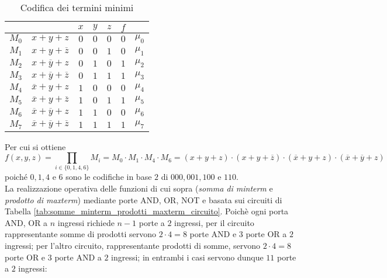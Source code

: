 \documentclass[a4paper]{extarticle}
\begin{document}
\begin{table}[H]
  \centering
  \begin{tabular}{c|c||ccc||c|c}
    $ $ & $ $ & $x$ & $y$ & $z$ & $f$\\
    \hline
    $M_0$ & $x + y + z$ & $0$ & $0$ & $0$ & $0$ & $\mu_0$\\
    $M_1$ & $x + y + \overline{z}$ & $0$ & $0$ & $1$ & $0$ & $\mu_1$\\
    $M_2$ & $x + \overline{y} + z$ & $0$ & $1$ & $0$ & $1$ & $\mu_2$\\
    $M_3$ & $x + \overline{y} + \overline{z}$ & $0$ & $1$ & $1$ & $1$ & $\mu_3$\\
    $M_4$ & $\overline{x} + y + z$ & $1$ & $0$ & $0$ & $0$ & $\mu_4$\\
    $M_5$ & $\overline{x} + y + \overline{z}$ & $1$ & $0$ & $1$ & $1$ & $\mu_5$\\
    $M_6$ & $\overline{x} + \overline{y} + z$ & $1$ & $1$ & $0$ & $0$ & $\mu_6$\\
    $M_7$ & $\overline{x} + \overline{y} + \overline{z}$ & $1$ & $1$ & $1$ & $1$ & $\mu_7$\\
  \end{tabular}
  \caption{Codifica dei termini minimi}
  \label{tab:codifica_termini_minimi}
\end{table}

\noindent
Per cui si ottiene
\[f(x, y, z) = \prod_{i \in \{0, 1, 4, 6\}} M_i = M_0 \cdot M_1  \cdot M_4 \cdot M_6 = (x + y + z) \cdot (x + y + \overline{z}) \cdot (\overline{x} + y + z) \cdot (\overline{x} + \overline{y} + z)\]
poiché \(0, 1, 4\) e \(6\) sono le codifiche in base \(2\) di \(000, 001, 100\) e \(110\).\\
La realizzazione operativa delle funzioni di cui sopra (\emph{somma di minterm} e \emph{prodotto di maxterm}) mediante porte AND, OR, NOT e basata sui circuiti di Tabella \ref{tab:somme_minterm_prodotti_maxterm_circuito}. Poichè ogni porta AND, OR a $n$ ingressi richiede $n - 1$ porte a $2$ ingressi, per il circuito rappresentante somme di prodotti servono \(2 \cdot 4 = 8\) porte AND e $3$ porte OR a $2$ ingressi; per l’altro circuito, rappresentante prodotti di somme, servono \(2 \cdot 4 = 8\) porte
OR e $3$ porte AND a $2$ ingressi; in entrambi i casi servono dunque $11$ porte a $2$ ingressi:
\end{document}
